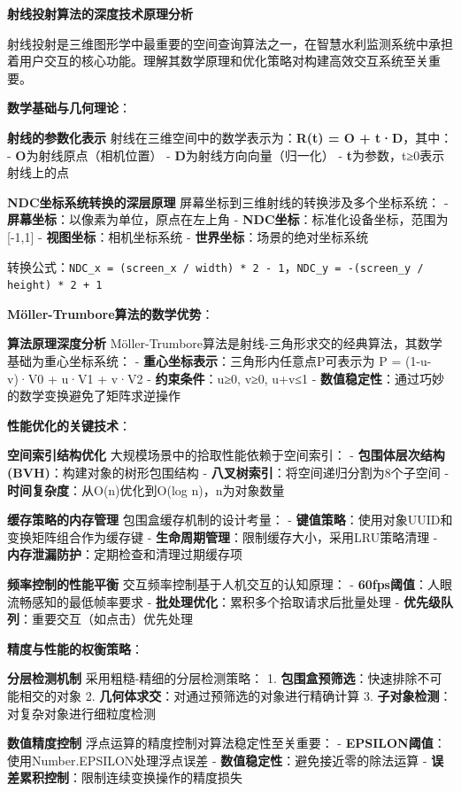 \textbf{射线投射算法的深度技术原理分析}

射线投射是三维图形学中最重要的空间查询算法之一，在智慧水利监测系统中承担着用户交互的核心功能。理解其数学原理和优化策略对构建高效交互系统至关重要。

\textbf{数学基础与几何理论}：

\textbf{射线的参数化表示} 射线在三维空间中的数学表示为：\textbf{R(t) = O + t·D}，其中： - \textbf{O}为射线原点（相机位置） - \textbf{D}为射线方向向量（归一化） - \textbf{t}为参数，t≥0表示射线上的点

\textbf{NDC坐标系统转换的深层原理} 屏幕坐标到三维射线的转换涉及多个坐标系统： - \textbf{屏幕坐标}：以像素为单位，原点在左上角 - \textbf{NDC坐标}：标准化设备坐标，范围为{[}-1,1{]} - \textbf{视图坐标}：相机坐标系统 - \textbf{世界坐标}：场景的绝对坐标系统

转换公式：\texttt{NDC_x = (screen_x / width) * 2 - 1}，\texttt{NDC_y = -(screen_y / height) * 2 + 1}

\textbf{Möller-Trumbore算法的数学优势}：

\textbf{算法原理深度分析} Möller-Trumbore算法是射线-三角形求交的经典算法，其数学基础为重心坐标系统： - \textbf{重心坐标表示}：三角形内任意点P可表示为 P = (1-u-v)·V0 + u·V1 + v·V2 - \textbf{约束条件}：u≥0, v≥0, u+v≤1 - \textbf{数值稳定性}：通过巧妙的数学变换避免了矩阵求逆操作

\textbf{性能优化的关键技术}：

\textbf{空间索引结构优化} 大规模场景中的拾取性能依赖于空间索引： - \textbf{包围体层次结构(BVH)}：构建对象的树形包围结构 - \textbf{八叉树索引}：将空间递归分割为8个子空间 - \textbf{时间复杂度}：从O(n)优化到O(log n)，n为对象数量

\textbf{缓存策略的内存管理} 包围盒缓存机制的设计考量： - \textbf{键值策略}：使用对象UUID和变换矩阵组合作为缓存键 - \textbf{生命周期管理}：限制缓存大小，采用LRU策略清理 - \textbf{内存泄漏防护}：定期检查和清理过期缓存项

\textbf{频率控制的性能平衡} 交互频率控制基于人机交互的认知原理： - \textbf{60fps阈值}：人眼流畅感知的最低帧率要求 - \textbf{批处理优化}：累积多个拾取请求后批量处理 - \textbf{优先级队列}：重要交互（如点击）优先处理

\textbf{精度与性能的权衡策略}：

\textbf{分层检测机制} 采用粗糙-精细的分层检测策略： 1. \textbf{包围盒预筛选}：快速排除不可能相交的对象 2. \textbf{几何体求交}：对通过预筛选的对象进行精确计算 3. \textbf{子对象检测}：对复杂对象进行细粒度检测

\textbf{数值精度控制} 浮点运算的精度控制对算法稳定性至关重要： - \textbf{EPSILON阈值}：使用Number.EPSILON处理浮点误差 - \textbf{数值稳定性}：避免接近零的除法运算 - \textbf{误差累积控制}：限制连续变换操作的精度损失

